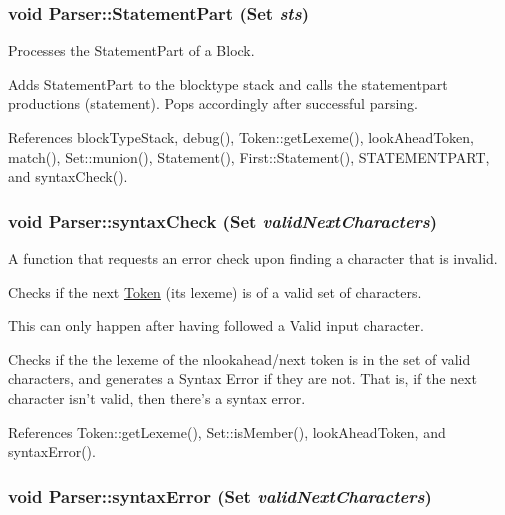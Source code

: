 \hypertarget{classParser_ac3ae7245f6ecc00a9e14cbed66a0b347}{
\subsubsection[{StatementPart}]{\setlength{\rightskip}{0pt plus 5cm}void Parser::StatementPart ({\bf Set} {\em sts})}}
\label{classParser_ac3ae7245f6ecc00a9e14cbed66a0b347}


Processes the StatementPart of a Block. 

Adds StatementPart to the blocktype stack and calls the statementpart productions (statement). Pops accordingly after successful parsing. 

References blockTypeStack, debug(), Token::getLexeme(), lookAheadToken, match(), Set::munion(), Statement(), First::Statement(), STATEMENTPART, and syntaxCheck().

\hypertarget{classParser_a61a1e512e33d3498f45d1e6f7c7aaf4d}{
\subsubsection[{syntaxCheck}]{\setlength{\rightskip}{0pt plus 5cm}void Parser::syntaxCheck ({\bf Set} {\em validNextCharacters})}}
\label{classParser_a61a1e512e33d3498f45d1e6f7c7aaf4d}


A function that requests an error check upon finding a character that is invalid. 

Checks if the next \hyperlink{classToken}{Token} (its lexeme) is of a valid set of characters.

This can only happen after having followed a Valid input character.

Checks if the the lexeme of the nlookahead/next token is in the set of valid characters, and generates a Syntax Error if they are not. That is, if the next character isn't valid, then there's a syntax error. 

References Token::getLexeme(), Set::isMember(), lookAheadToken, and syntaxError().

\hypertarget{classParser_a705ca7e2357f506dc5bea989e40ca11f}{
\subsubsection[{syntaxError}]{\setlength{\rightskip}{0pt plus 5cm}void Parser::syntaxError ({\bf Set} {\em validNextCharacters})}}
\label{classParser_a705ca7e2357f506dc5bea989e40ca11f}


